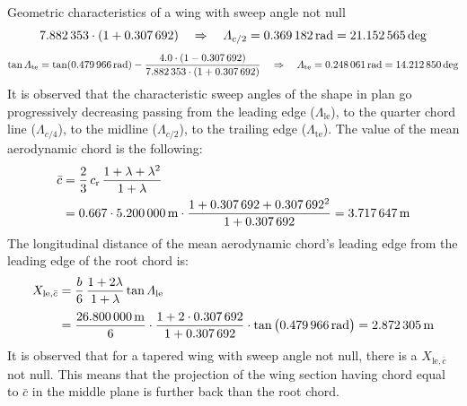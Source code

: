 \documentclass[[12pt,twoside]{book}
\begin{document}
\begin{myExampleX}{Geometric characteristics of a wing with sweep angle not null}{}
\[{      }{
         \num[round-precision=2]{\myAspectRatioWing}
         \cdot (1+\SI[round-precision=2]{\myTaperRatioWing}{})} 
   \quad
   \Rightarrow
   \quad
   \Lambda_{c/2}
      =\SI[round-precision=3]{\myLambdaCHalfRad}{\radian} 
      =\SI[round-precision=1]{\myLambdaCHalfDeg}{\deg} 
\]
%
\[
\tan
\Lambda_\mathrm{te}
   = \tan (\SI[round-precision=3]{\myLambdaLERad}{\radian})
      - \dfrac{
         \num[round-precision=2]{4.0}
         \cdot (1-\SI[round-precision=2]{\myTaperRatioWing}{})
      }{
         \num[round-precision=2]{\myAspectRatioWing}
         \cdot (1+\SI[round-precision=2]{\myTaperRatioWing}{})} 
   \quad
   \Rightarrow
   \quad
   \Lambda_\mathrm{te}
      =\SI[round-precision=3]{\myLambdaTERad}{\radian}
      =\SI[round-precision=1]{\myLambdaTEDeg}{\deg} 
\]
It is observed that the characteristic sweep angles of the shape in plan go progressively decreasing passing from the leading edge ($\Lambda_\mathrm{le}$), 
to the quarter chord line ($\Lambda_{c/4}$),
to the midline ($\Lambda_{c/2}$),
to the trailing edge ($\Lambda_\mathrm{te}$).
The value of the mean aerodynamic chord is the following:
\[
\begin{split}
\bar{c} & {}= \frac{2}{3} \, c_\mathrm{r} \, \frac{1+\lambda + \lambda^2}{1+\lambda} \\
  & {}=
    \num{0.667} \cdot \SI[round-precision=2]{\myChordRootWingMT}{\metre}
      \cdot 
        \frac{
          1 + \SI[round-precision=2]{\myTaperRatioWing}{} + \SI[round-precision=2]{\myTaperRatioWing}{}^2
        }{
          1 + \SI[round-precision=2]{\myTaperRatioWing}{}
        }
    = \SI[round-precision=2]{\myMACWingMT}{\metre} 
\end{split}
\]
The longitudinal distance of the mean aerodynamic chord's leading edge from the leading edge of the root chord is:
\[
\begin{split}
X_{\mathrm{le},\bar{c}} 
  & {}=
    \frac{b}{6} \, \frac{1+2\lambda}{1+\lambda} \tan\Lambda_\mathrm{le} \\[3pt]
  & {}=
    \frac{\SI[round-precision=1]{\mySpanWingMT}{\metre}}{6}
      \cdot 
      \frac{
        1 + 2\cdot\SI[round-precision=2]{\myTaperRatioWing}{}
      }{
        1 + \SI[round-precision=2]{\myTaperRatioWing}{}
      }
      \cdot \tan \big( \SI[round-precision=3]{\myLambdaLERad}{\radian} \big)
    = \SI[round-precision=2]{\myXLEMACWingMT}{\metre} 
\end{split}
\]
It is observed that for a tapered wing with sweep angle not null, there is a
$X_{\mathrm{le},\bar{c}}$ not null. This means that the projection of the wing section having chord equal to $\bar{c}$ in the middle plane is further back than the root chord.

\end{myExampleX}
\end{document}
